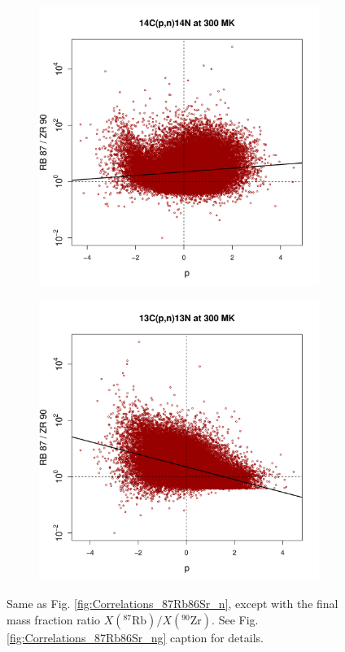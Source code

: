 \begin{figure}[t]
\begin{subfigure}[b]{0.495\textwidth}
\end{subfigure}
\begin{subfigure}[b]{0.495\textwidth}   
\centering 
\includegraphics[width=\textwidth]{Chapter-3/figs/CorrRB87ZR90_14C_p_n_14N_300MK.png}
\end{subfigure}
\hfill
\begin{subfigure}[b]{0.495\textwidth}   
\centering 
\includegraphics[width=\textwidth]{Chapter-3/figs/CorrRB87ZR90_13C_p_n_13N_300MK.png}
\end{subfigure}
\caption{\label{fig:Correlations_87Rb90Zr_n}Same as Fig. \ref{fig:Correlations_87Rb86Sr_n}, except with the final mass fraction ratio $X(^{87}\mathrm{Rb})/X(^{90}\mathrm{Zr})$. See Fig. \ref{fig:Correlations_87Rb86Sr_ng} caption for details.}
\end{figure}

